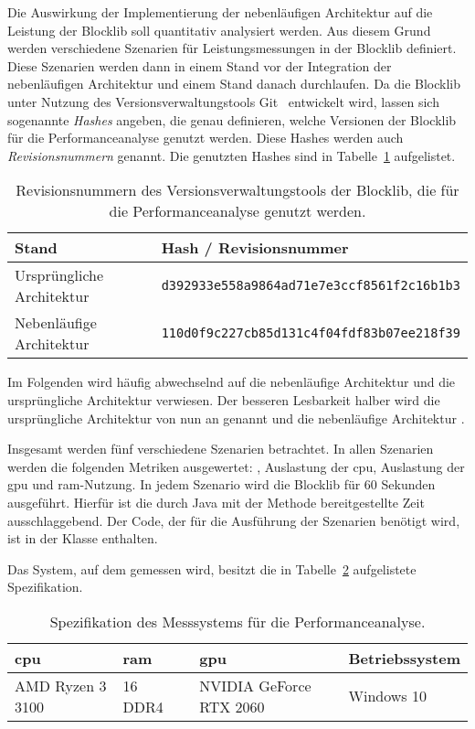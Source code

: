 Die Auswirkung der Implementierung der nebenläufigen Architektur auf die Leistung der Blocklib soll quantitativ analysiert werden. Aus diesem Grund werden verschiedene Szenarien für Leistungsmessungen in der Blocklib definiert. Diese Szenarien werden dann in einem Stand vor der Integration der nebenläufigen Architektur und einem Stand danach durchlaufen. Da die Blocklib unter Nutzung des Versionsverwaltungstools Git~\cite{Chacon2014} entwickelt wird, lassen sich sogenannte \emph{Hashes} angeben, die genau definieren, welche Versionen der Blocklib für die Performanceanalyse genutzt werden. Diese Hashes werden auch \emph{Revisionsnummern} genannt. Die genutzten Hashes sind in Tabelle~\ref{tab:perfHash} aufgelistet.

\begin{table}[!htbp]
	\centering
	\begin{tabular}{ll}
		\toprule
		Stand & Hash / Revisionsnummer \\
		\midrule
		Ursprüngliche Architektur & \texttt{d392933e558a9864ad71e7e3ccf8561f2c16b1b3} \\
		Nebenläufige Architektur & \texttt{110d0f9c227cb85d131c4f04fdf83b07ee218f39}\\
		\bottomrule
	\end{tabular}
	\caption{Revisionsnummern des Versionsverwaltungstools der Blocklib, die für die Performanceanalyse genutzt werden.}\label{tab:perfHash}
\end{table}

Im Folgenden wird häufig abwechselnd auf die nebenläufige Architektur und die ursprüngliche Architektur verwiesen. Der besseren Lesbarkeit halber wird die ursprüngliche Architektur von nun an \emph{\sysA{}} genannt und die nebenläufige Architektur \emph{\sysB{}}.

Insgesamt werden fünf verschiedene Szenarien betrachtet. In allen Szenarien werden die folgenden Metriken ausgewertet: \si{\fps}, Auslastung der \acs{cpu}, Auslastung der \ac{gpu} und \ac{ram}-Nutzung. In jedem Szenario wird die Blocklib für 60 Sekunden ausgeführt. Hierfür ist die durch Java mit der Methode  bereitgestellte Zeit ausschlaggebend. Der Code, der für die Ausführung der Szenarien benötigt wird, ist in der Klasse \classThreadingProgram{} enthalten.

Das System, auf dem gemessen wird, besitzt die in Tabelle~\ref{tab:spec} aufgelistete Spezifikation.

\begin{table}[!h]
	\centering
	\begin{tabular}[]{llll}
		\ac{cpu} & \ac{ram} & \ac{gpu} & Betriebssystem\\
		\midrule
		AMD Ryzen 3 3100 & \SI{16}{\giga\byte} DDR4 & NVIDIA GeForce RTX 2060 & Windows 10
	\end{tabular}
	\caption{Spezifikation des Messsystems für die Performanceanalyse.}\label{tab:spec}
\end{table}


